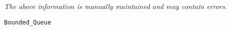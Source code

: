 \label{pkg:bounded\_queue}

{\tiny \it The above information is manually maintained and may contain errors.}
\begin{verbatim}
Bounded_Queue
\end{verbatim}
